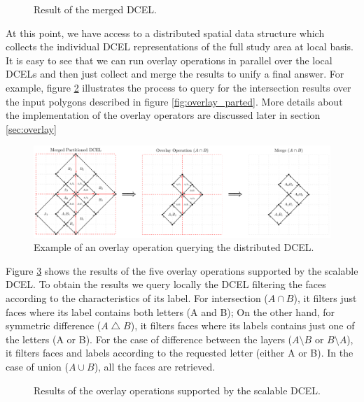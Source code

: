 \begin{figure}[!ht]
    \centering
        
    \caption{Result of the merged DCEL.}\label{fig:merged_dcel}
\end{figure}

At this point, we have access to a distributed spatial data structure which collects the individual DCEL representations of the full study area at local basis.  It is easy to see that we can run overlay operations in parallel over the local DCELs and then just collect and merge the results to unify a final answer.  For example, figure \ref{fig:overlay_parted2} illustrates the process to query for the intersection results over the input polygons described in figure \ref{fig:overlay_parted}.  More details about the implementation of the overlay operators are discussed later in section \ref{sec:overlay}

\begin{figure}[!ht]
    \centering
    \includegraphics[width=\linewidth]{figures/03-OverlayParted2}
    \caption{Example of an overlay operation querying the distributed DCEL.} \label{fig:overlay_parted2}
\end{figure}

Figure \ref{fig:overlay_operations} shows the results of the five overlay operations supported by the scalable DCEL.  To obtain the results we query locally the DCEL filtering the faces according to the characteristics of its label.  For intersection ($A \cap B$), it filters just faces where its label contains both letters (A and B); On the other hand, for symmetric difference ($A \bigtriangleup B$), it filters faces where its labels contains just one of the letters (A or B).  For the case of difference between the layers ($A \setminus B$ or $B \setminus A$), it filters faces and labels according to the requested letter (either A or B). In the case of union ($A \cup B$), all the faces are retrieved. 

\begin{figure}[!ht]
    \centering
    
    \caption{Results of the overlay operations supported by the scalable DCEL.}\label{fig:overlay_operations}
\end{figure}

